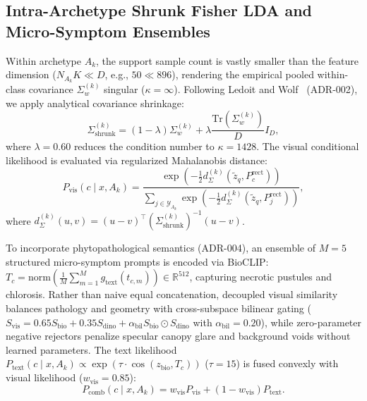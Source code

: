 \subsection{Intra-Archetype Shrunk Fisher LDA and Micro-Symptom Ensembles}
\label{subsec:shrunk_fisher_lda}
Within archetype $A_k$, the support sample count is vastly smaller than the feature dimension ($N_{A_k} K \ll D$, e.g., $50 \ll 896$), rendering the empirical pooled within-class covariance $\Sigma_w^{(k)}$ singular ($\kappa = \infty$). Following Ledoit and Wolf~\cite{ledoit2004well} (ADR-002), we apply analytical covariance shrinkage:
\begin{equation}
    \Sigma_{\text{shrunk}}^{(k)} = (1 - \lambda) \Sigma_w^{(k)} + \lambda \frac{\text{Tr}\left(\Sigma_w^{(k)}\right)}{D} I_D,
    \label{eq:shrunk_cov}
\end{equation}
where $\lambda = 0.60$ reduces the condition number to $\kappa = 1428$. The visual conditional likelihood is evaluated via regularized Mahalanobis distance:
\begin{equation}
    P_{\text{vis}}(c \mid x, A_k) = \frac{\exp\left( -\frac{1}{2} d_{\Sigma}^{(k)}\left(\tilde{z}_q, P_c^{\text{rect}}\right) \right)}{\sum_{j \in \mathcal{Y}_{A_k}} \exp\left( -\frac{1}{2} d_{\Sigma}^{(k)}\left(\tilde{z}_q, P_j^{\text{rect}}\right) \right)},
    \label{eq:p_vis}
\end{equation}
where $d_{\Sigma}^{(k)}(u, v) = (u - v)^\top (\Sigma_{\text{shrunk}}^{(k)})^{-1} (u - v)$.

To incorporate phytopathological semantics (ADR-004), an ensemble of $M = 5$ structured micro-symptom prompts is encoded via BioCLIP: $T_c = \text{norm}\left(\frac{1}{M}\sum_{m=1}^M g_{\text{text}}(t_{c,m})\right) \in \mathbb{R}^{512}$, capturing necrotic pustules and chlorosis. Rather than naive equal concatenation, decoupled visual similarity balances pathology and geometry with cross-subspace bilinear gating ($S_{\text{vis}} = 0.65 S_{\text{bio}} + 0.35 S_{\text{dino}} + \alpha_{\text{bil}} S_{\text{bio}} \odot S_{\text{dino}}$ with $\alpha_{\text{bil}}=0.20$), while zero-parameter negative rejectors penalize specular canopy glare and background voids without learned parameters. The text likelihood $P_{\text{text}}(c \mid x, A_k) \propto \exp\left(\tau \cdot \cos(z_{\text{bio}}, T_c)\right)$ ($\tau=15$) is fused convexly with visual likelihood ($w_{\text{vis}} = 0.85$):
\begin{equation}
    P_{\text{comb}}(c \mid x, A_k) = w_{\text{vis}} P_{\text{vis}} + (1 - w_{\text{vis}}) P_{\text{text}}.
    \label{eq:p_comb}
\end{equation}

